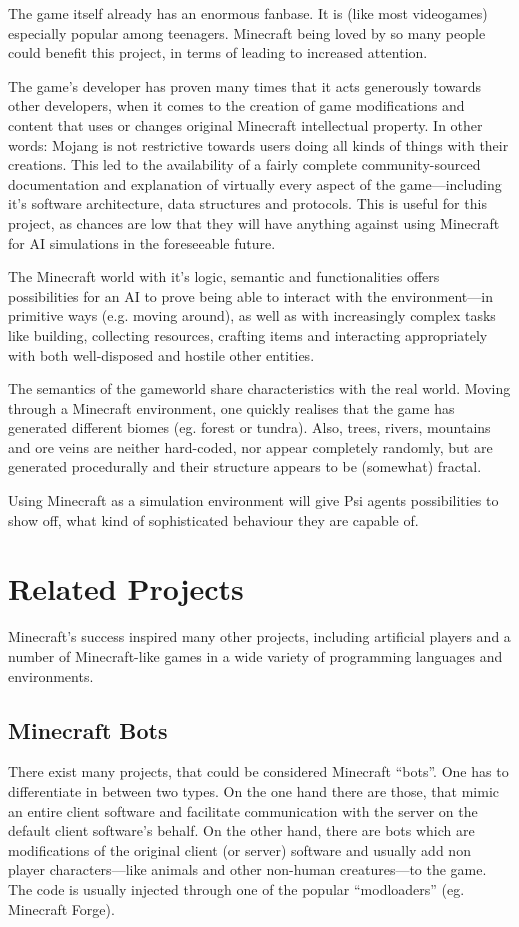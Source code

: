 The game itself already has an enormous fanbase. It is (like most videogames) especially popular among teenagers. Minecraft being loved by so many people could benefit this project, in terms of leading to increased attention.

The game's developer has proven many times that it acts generously towards  other developers, when it comes to the creation of game modifications and content that uses or changes original Minecraft intellectual property. In other words: Mojang is not restrictive towards users doing all kinds of things with their creations. This led to the availability of a fairly complete community-sourced  documentation and explanation of virtually every aspect of the game---including it's software architecture, data structures and protocols. This is useful for this project, as chances are low that they will have anything against using Minecraft for AI simulations in the foreseeable future. %

The Minecraft world with it's logic, semantic and functionalities offers possibilities for an AI to prove being able to interact with the environment---in primitive ways (e.g. moving around), as well as with increasingly complex tasks like building, collecting resources, crafting items and interacting appropriately with both well-disposed and hostile other entities.

The semantics of the gameworld share characteristics with the real world. Moving through a Minecraft environment, one quickly realises that the game has generated different biomes (eg. forest or tundra). Also, trees, rivers, mountains and ore veins are neither hard-coded, nor appear completely randomly, but are generated procedurally and their structure appears to be (somewhat) fractal.
        
Using Minecraft as a simulation environment will give Psi agents possibilities to show off, what kind of sophisticated behaviour they are capable of.

    \section{Related Projects}
Minecraft's success inspired many other projects, including artificial players and a number of Minecraft-like games in a wide variety of programming languages and environments.


        \subsection{Minecraft Bots}
There exist many projects, that could be considered Minecraft ``bots''. One has to differentiate in between two types. On the one hand there are those, that mimic an entire client software and facilitate communication with the server on the default client software's behalf. On the other hand, there are bots which are modifications of the original client (or server) software and usually add non player characters---like animals and other non-human creatures---to the game. The code is usually injected through one of the popular ``modloaders'' (eg. Minecraft Forge).

